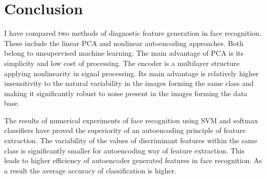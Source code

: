 \section{Conclusion}

I have compared two methods of diagnostic feature generation in face
recognition. These include the linear PCA and nonlinear autoencoding approaches.
Both belong to unsupervised machine learning. The main advantage of
PCA is its simplicity and low cost of processing. The encoder is a multilayer
structure applying nonlinearity in signal processing. Its main advantage is
relatively higher insensitivity to the natural variability in the images forming
the same class and making it significantly robust to noise present in the images
forming the data base. 

The results of numerical experiments of face recognition using SVM and softmax
classifiers have proved the superiority of an autoencoding principle of feature
extraction. The variability of the values of discriminant features within the
same class is significantly smaller for autoencoding way of feature extraction.
This leads to higher efficiency of autoencoder generated features in face
recognition. As a result the average accuracy of classification is higher.
